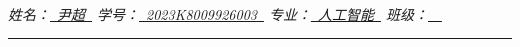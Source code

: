 \documentclass[UTF8]{article}
\theoremstyle{MyLineTheoremStyle} %
\theoremstyle{MyBlockTheoremStyle} %
\theoremstyle{MySubsubsectionStyle} %
\begin{document}


\begin{center}\large
    \\\vspace{0.4cm}
    \noindent\textit{
        姓名：\uline{\,\,\,尹超\,\,\,}\hspace{0.2cm}
        学号：\uline{\,\,\,{\upshape 2023K8009926003}\,\,\,}\hspace{0.2cm}
        专业：\uline{\,\,\,人工智能\,\,\,}\hspace{0.2cm}
        班级：\uline{\,\,\,\,\,\,}
    }
    \\\vspace{0.1cm}
\end{center}
\noindent\rule{\textwidth}{0.1em}   %


\setcounter{tocdepth}{2}  %
\noindent\tableofcontents\thispagestyle{fancy}   %
\end{document}
